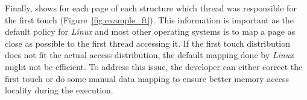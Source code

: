 Finally, \TABARNAC shows for each page of each structure
which thread was responsible for the first touch
(Figure~\ref{fig:example_ft}). This information is important as the
default policy for \emph{Linux} and most other operating systems is to map a page as close as possible to the first
thread accessing it. If the first touch distribution does not fit the actual
access distribution, the default mapping done by \emph{Linux} might not be
efficient. To address this issue, the developer can either correct the first
touch or do some manual data mapping to ensure better memory access locality
during the execution.
